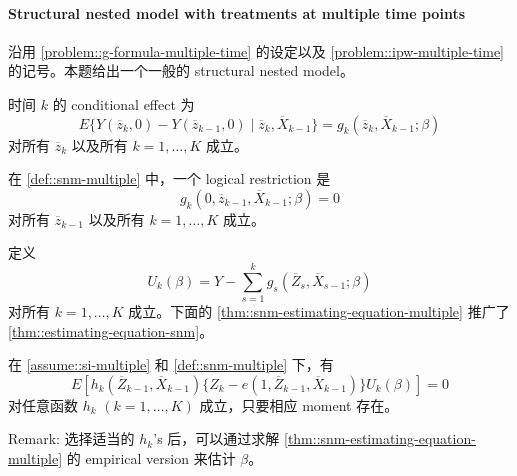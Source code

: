   
   \paragraph{Structural nested model with treatments at multiple time points}\label{problem::snm-multiple-time}


沿用 \cref{problem::g-formula-multiple-time} 的设定以及 \cref{problem::ipw-multiple-time} 的记号。本题给出一个一般的 structural nested model。

\begin{definition}
\label{def::snm-multiple}
时间 $k$ 的 conditional effect 为
$$
E\{  Y(\overline{z}_k,0) - Y( \overline{z}_{k-1},0) \mid \overline{z}_k , \overline{X}_{k-1} \} = g_k( \overline{z}_k, \overline{X}_{k-1}; \beta) 
$$
对所有 $\overline{z}_k$ 以及所有 $k=1,\ldots, K$ 成立。
\end{definition}


 
在 \cref{def::snm-multiple} 中，一个 logical restriction 是
$$
g_k(0,  \overline{z}_{k-1}, \overline{X}_{k-1}; \beta)    = 0
$$ 
对所有 $\overline{z}_{k-1}$ 以及所有 $k=1,\ldots, K$ 成立。


定义
$$
U_k(\beta) = Y - \sum_{s=1}^k  g_s( \overline{Z}_s, \overline{X}_{s-1}; \beta) 
$$
对所有 $k=1,\ldots, K$ 成立。下面的 \cref{thm::snm-estimating-equation-multiple} 推广了 \cref{thm::estimating-equation-snm}。



\begin{theorem}
\label{thm::snm-estimating-equation-multiple}
在 \cref{assume::si-multiple} 和 \cref{def::snm-multiple} 下，有
$$
E\left[    h_k( \overline{Z}_{k-1}, \overline{X}_{k-1} ) \{  Z_k - e(1, \overline{Z}_{k-1}, \overline{X}_{k-1}) \}  U_k(\beta) 
\right] = 0
$$
对任意函数 $h_k$ $(k=1,\ldots, K)$ 成立，只要相应 moment 存在。
\end{theorem}



Remark: 选择适当的 $h_k$'s 后，可以通过求解 \cref{thm::snm-estimating-equation-multiple} 的 empirical version 来估计 $\beta$。


  
    
